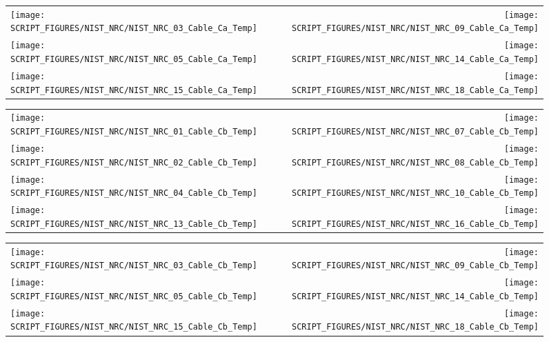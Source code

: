 \begin{figure}[p]
\begin{tabular*}{\textwidth}{l@{\extracolsep{\fill}}r}
\texttt{[image: SCRIPT\_FIGURES/NIST\_NRC/NIST\_NRC\_03\_Cable\_Ca\_Temp]} &
\texttt{[image: SCRIPT\_FIGURES/NIST\_NRC/NIST\_NRC\_09\_Cable\_Ca\_Temp]} \\
\texttt{[image: SCRIPT\_FIGURES/NIST\_NRC/NIST\_NRC\_05\_Cable\_Ca\_Temp]} &
\texttt{[image: SCRIPT\_FIGURES/NIST\_NRC/NIST\_NRC\_14\_Cable\_Ca\_Temp]} \\
\texttt{[image: SCRIPT\_FIGURES/NIST\_NRC/NIST\_NRC\_15\_Cable\_Ca\_Temp]} &
\texttt{[image: SCRIPT\_FIGURES/NIST\_NRC/NIST\_NRC\_18\_Cable\_Ca\_Temp]}
\end{tabular*}
\label{NIST_NRC_Cable_Ca_Open}
\end{figure}

\begin{figure}[p]
\begin{tabular*}{\textwidth}{l@{\extracolsep{\fill}}r}
\texttt{[image: SCRIPT\_FIGURES/NIST\_NRC/NIST\_NRC\_01\_Cable\_Cb\_Temp]} &
\texttt{[image: SCRIPT\_FIGURES/NIST\_NRC/NIST\_NRC\_07\_Cable\_Cb\_Temp]} \\
\texttt{[image: SCRIPT\_FIGURES/NIST\_NRC/NIST\_NRC\_02\_Cable\_Cb\_Temp]} &
\texttt{[image: SCRIPT\_FIGURES/NIST\_NRC/NIST\_NRC\_08\_Cable\_Cb\_Temp]} \\
\texttt{[image: SCRIPT\_FIGURES/NIST\_NRC/NIST\_NRC\_04\_Cable\_Cb\_Temp]} &
\texttt{[image: SCRIPT\_FIGURES/NIST\_NRC/NIST\_NRC\_10\_Cable\_Cb\_Temp]} \\
\texttt{[image: SCRIPT\_FIGURES/NIST\_NRC/NIST\_NRC\_13\_Cable\_Cb\_Temp]} &
\texttt{[image: SCRIPT\_FIGURES/NIST\_NRC/NIST\_NRC\_16\_Cable\_Cb\_Temp]}
\end{tabular*}
\label{NIST_NRC_Cable_Cb_Closed}
\end{figure}

\begin{figure}[p]
\begin{tabular*}{\textwidth}{l@{\extracolsep{\fill}}r}
\texttt{[image: SCRIPT\_FIGURES/NIST\_NRC/NIST\_NRC\_03\_Cable\_Cb\_Temp]} &
\texttt{[image: SCRIPT\_FIGURES/NIST\_NRC/NIST\_NRC\_09\_Cable\_Cb\_Temp]} \\
\texttt{[image: SCRIPT\_FIGURES/NIST\_NRC/NIST\_NRC\_05\_Cable\_Cb\_Temp]} &
\texttt{[image: SCRIPT\_FIGURES/NIST\_NRC/NIST\_NRC\_14\_Cable\_Cb\_Temp]} \\
\texttt{[image: SCRIPT\_FIGURES/NIST\_NRC/NIST\_NRC\_15\_Cable\_Cb\_Temp]} &
\texttt{[image: SCRIPT\_FIGURES/NIST\_NRC/NIST\_NRC\_18\_Cable\_Cb\_Temp]}
\end{tabular*}
\label{NIST_NRC_Cable_Cb_Open}
\end{figure}

